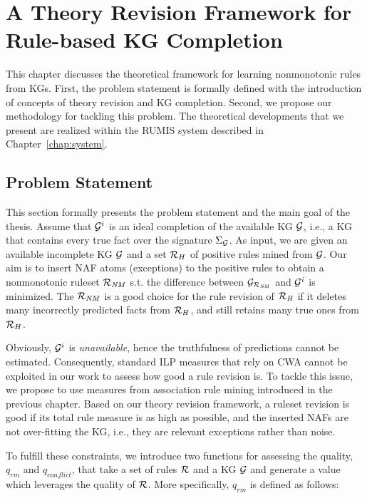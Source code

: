 \chapter{A Theory Revision Framework for Rule-based KG Completion}
\label{chap:frame}

This chapter discusses the theoretical framework for learning nonmonotonic rules from KGs. First, the problem statement is formally defined with the introduction of concepts of theory revision and KG completion. Second, we propose our methodology for tackling this problem. The theoretical developments that we present are realized within the RUMIS system described in Chapter~\ref{chap:system}.

\section{Problem Statement}

This section formally presents the problem statement and the main goal of the thesis. Assume that $\mathcal{G}^i$ is an ideal completion of the available KG $\mathcal{G}$, i.e., a KG that contains every true fact over the signature $\Sigma_{\mathcal{G}}$. As input, we are given an available incomplete KG $\mathcal{G}$ and a set $\mathcal{R}_H$ of positive rules mined from $\mathcal{G}$. Our aim is to insert NAF atoms (exceptions) to the positive rules to obtain a nonmonotonic ruleset $\mathcal{R}_{\mathit{NM}}$ s.t. the difference between $\mathcal{G}_{\mathcal{R}_{\mathit{NM}}}$ and $\mathcal{G}^i$ is minimized. The $\mathcal{R}_{\mathit{NM}}$ is a good choice for the rule revision of $\mathcal{R}_{\mathit{H}}$ if it deletes many incorrectly predicted facts from $\mathcal{R}_H$, and still retains many true ones from $\mathcal{R}_H$.

Obviously, $\mathcal{G}^i$ is \emph{unavailable}, hence the truthfulness of predictions cannot be estimated. Consequently, standard ILP measures that rely on CWA cannot be exploited in our work to assess how good a rule revision is. To tackle this issue, we propose to use measures from association rule mining introduced in the previous chapter. Based on our theory revision framework, a ruleset revision is good if its total rule measure is as high as possible, and the inserted NAFs are not over-fitting the KG, i.e., they are relevant exceptions rather than noise.

To fulfill these constraints, we introduce two functions for assessing the quality, $q_{rm}$ and $q_{conflict}$, that take a set of rules $\mathcal{R}$ and a KG $\mathcal{G}$ and generate a value which leverages the quality of $\mathcal{R}$. More specifically, $q_{rm}$ is defined as follows:


